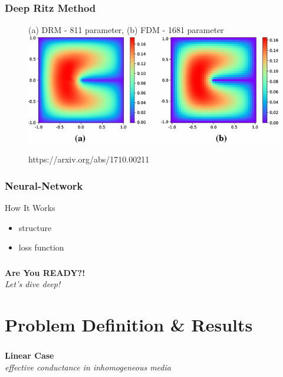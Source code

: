 \documentclass{beamer}
\begin{document}
\begin{frame}
	\frametitle{Deep Ritz Method}
	\begin{figure}
		\begin{block}{(a) DRM - 811 parameter, (b) FDM - 1681 parameter}		
		\includegraphics[width=\textwidth,height=\textheight,keepaspectratio]{DRMvsFDM.png}
		\caption{https://arxiv.org/abs/1710.00211}
	\end{block}
	\end{figure}
\end{frame}

\begin{frame}
	\frametitle{Neural-Network}
	\begin{block}{How It Works}
		\begin{itemize}
			\item<1- > structure
			\item<2- > loss function
		\end{itemize}
	\end{block}
\end{frame}

\begin{frame}
	\frametitle{}
	
	\textbf{Are You READY?!}\centering\\
	\textit{Let's dive deep!}\centering\\
	
\end{frame}
\section{Problem Definition \& Results}
\begin{frame}
	\frametitle{}
	
	\textbf{Linear Case}\centering\\
	\textit{effective conductance in inhomogeneous media}\centering\\
	
\end{frame}
\end{document}
